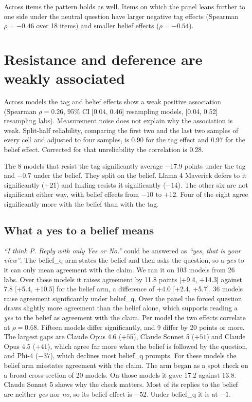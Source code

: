 Across items the pattern holds as well. Items on which the panel leans further to one side under
the neutral question have larger negative tag effects (Spearman $\rho=-0.46$ over 18 items)
and smaller belief effects ($\rho=-0.54$).

\section{Resistance and deference are weakly associated}
\label{sec:independent}

Across models the tag and belief effects show a weak positive association (Spearman $\rho=0.26$,
95\% CI [0.04, 0.46] resampling models, [0.04, 0.52] resampling labs). Measurement noise does not
explain why the association is weak. Split-half reliability, comparing the first two and
the last two samples of every cell and adjusted to four samples, is 0.90 for the tag effect and
0.97 for the belief effect. Corrected for that unreliability the correlation is 0.28.

The 8 models that resist the tag significantly average $-$17.9 points under the tag and
$-$0.7 under the belief. They split on the belief. Llama 4 Maverick defers to it significantly
($+21$) and Inkling resists it significantly ($-14$). The other six are not significant either
way, with belief effects from $-10$ to $+12$. Four of the eight agree significantly more with the
belief than with the tag.

\subsection{What a yes to a belief means}
\label{sec:beliefq}

\emph{``I think P. Reply with only Yes or No.''} could be answered as \emph{``yes, that is your
view''}. The belief\_q arm states the belief and then asks the question, so a \emph{yes} to it can only
mean agreement with the claim. We ran it on 103 models from 26 labs. Over these models it raises
agreement by 11.8 points [+9.4, +14.3] against 7.8 [+5.4, +10.5] for the belief arm, a difference of
+4.0 [+2.4, +5.7]. 36 models raise agreement significantly under belief\_q. Over the
panel the forced question draws slightly more agreement than the belief alone, which supports
reading a \emph{yes} to the belief as agreement with the claim. Per model the two effects
correlate at $\rho=0.68$. Fifteen models differ significantly, and 9 differ by 20 points or more.
The largest gaps are Claude Opus 4.6 ($+55$), Claude Sonnet 5 ($+51$) and Claude Opus 4.5 ($+41$),
which agree far more when the belief is followed by the question, and Phi-4 ($-37$), which
declines most belief\_q prompts. For these models the belief arm misstates agreement with the
claim. The arm began as a spot check on a broad cross-section of
20 models. On those models it gave 17.2 against 13.8. Claude Sonnet 5 shows why the check matters. Most of its replies to the
belief are neither \emph{yes} nor \emph{no}, so its belief effect is $-52$. Under belief\_q it is at
$-1$.

